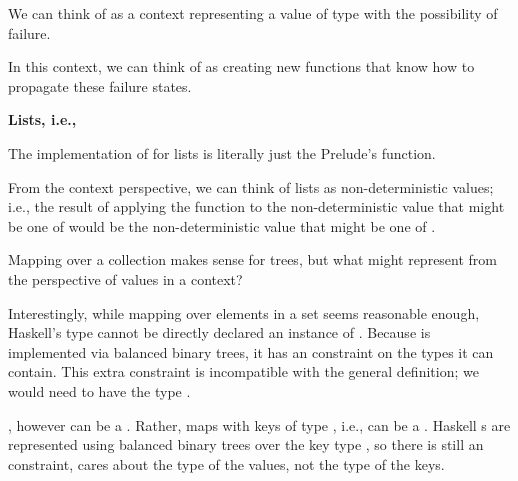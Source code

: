 \begin{notelist}
    \item \textbf{}
    \begin{notelist}
        \item We can think of  as a context representing a value of type  with the 
              possibility of failure.
        \item In this context, we can think of  as creating new functions that know how to
              propagate these failure states.
    \end{notelist}

    \item \textbf{Lists, i.e., \code{[]}}
    \begin{notelist}
        \item The implementation of  for lists is literally just the Prelude's  function.
        \item From the context perspective, we can think of lists as non-deterministic values; i.e., the
              result of applying the function  to the non-deterministic value that might be
              one of \code{[1, 2, 3]} would be the non-deterministic value that might be one of
              \code{[2, 4, 6]}.
    \end{notelist}

    \item \textbf{}
    \begin{notelist}
        \item Mapping over a collection makes sense for trees, but what might  represent from the perspective
              of values in a context?
        \item Interestingly, while mapping over elements in a set seems reasonable enough, Haskell's  type
              cannot be directly declared an instance of . Because  is implemented via balanced
              binary trees, it has an  constraint on the types it can contain. This extra constraint is
              incompatible with the general  definition; we would need  to have the type
              .
        \item {}, however can be a . Rather, maps with keys of type , i.e., 
              can be a . Haskell s are represented using balanced binary trees over the
              key type , so there is still an  constraint,  cares about the type of
              the values, not the type of the keys.
    \end{notelist}


\end{notelist}
